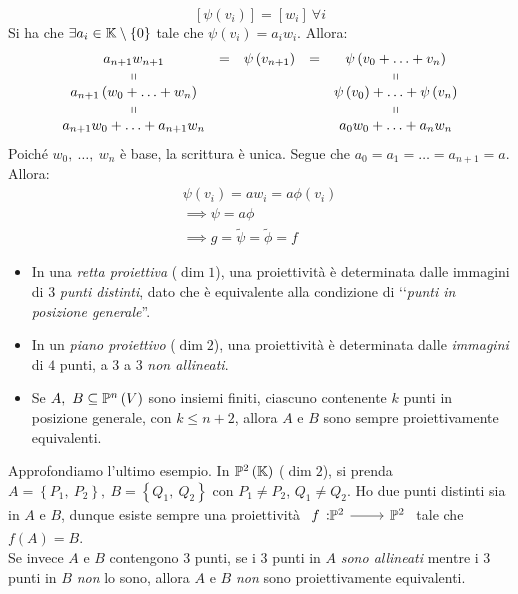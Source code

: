 \begin{demonstration}
\begin{itemize}
\begin{equation*}
	\left[\psi\left(v_i\right)\right]=\left[w_i\right]\ \forall i
\end{equation*}
Si ha che $\exists a_i\in\mathbb{K}\setminus\left\{0\right\}$ tale che $\psi\left(v_i\right)=a_iw_i$. Allora:
\begin{equation*}
	\begin{array}{ccccc}
		a_{n+1}w_{n+1}&=&\psi\left(v_{n+1}\right)&=&\psi\left(v_0+\ldots+v_n\right)\\
		\shortparallel&&&&\shortparallel\\
		a_{n+1}\left(w_0+\ldots+w_n\right)&&&&\psi\left(v_0\right)+\ldots+\psi\left(v_n\right)\\
		\shortparallel&&&&\shortparallel\\
		a_{n+1}w_0+\ldots+a_{n+1}w_n&&&&a_0w_0+\ldots+a_nw_n
	\end{array}
\end{equation*}
Poiché $w_0,\ \ldots,\ w_n$ è base, la scrittura è unica. Segue che $a_0=a_1=\ldots=a_{n+1}=a$. Allora:
\begin{equation*}
	\begin{array}{l}
		\psi\left(v_i\right)=aw_i=a\phi\left(v_i\right)\\
		\implies \psi=a\phi\\
		\implies g=\widetilde{\psi}=\widetilde{\phi}=f
	\end{array}
\end{equation*}
	\end{itemize}
\end{demonstration}
\begin{examples}
	\begin{itemize}
		\item In una \textit{retta proiettiva} ($\dim 1$), una proiettività è determinata dalle immagini di $3$ \textit{punti distinti}, dato che è equivalente alla condizione di ‘‘\textit{punti in posizione generale}''.
		\item In un \textit{piano proiettivo} ($\dim 2$), una proiettività è determinata dalle \textit{immagini} di $4$ punti, a $3$ a $3$ \textit{non allineati}.
		\item Se $A,\ B\subseteq \proj{V}$ sono insiemi finiti, ciascuno contenente $k$ punti in posizione generale, con $k\leq n+2$, allora $A$ e $B$ sono sempre proiettivamente equivalenti.
	\end{itemize}
\end{examples}
\begin{example}
	Approfondiamo l'ultimo esempio. In $\proj[2]{\kamp}$ ($\dim 2$), si prenda $A=\left\{P_1,\ P_2\right\},\ B=\left\{Q_1,\ Q_2\right\}$ con $P_1\neq P_2$, $Q_1\neq Q_2$. Ho due punti distinti sia in $A$ e $B$, dunque esiste sempre una proiettività $\funz{f}{\proj[2]{\ }}{\proj[2]{\ }}$ tale che $f\left(A\right)=B$.\\
	Se invece $A$ e $B$ contengono $3$ punti, se i $3$ punti in $A$ \textit{sono allineati} mentre i $3$ punti in $B$ \textit{non} lo sono, allora $A$ e $B$ \textit{non} sono proiettivamente equivalenti.
\end{example}
